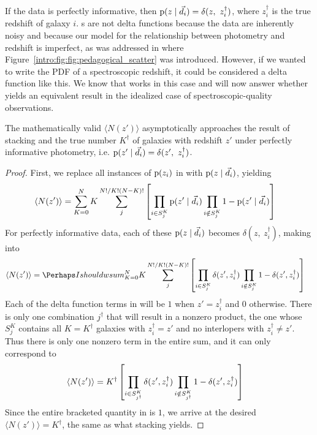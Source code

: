 If the data is perfectly informative, then $\pr{z \gvn \data_{i}} = \delta(z,\ z_{i}^{\dagger})$, where $z_{i}^{\dagger}$ is the true redshift of galaxy $i$.
\Pzpdf s are not delta functions because the data are inherently noisy and because our model for the relationship between photometry and redshift is imperfect, as was addressed in  where Figure~\ref{intro:fig:fig:pedagogical_scatter} was introduced.
However, if we wanted to write the PDF of a spectroscopic redshift, it could be considered a delta function like this.
We know that  works in this case and will now answer whether  yields an equivalent result in the idealized case of spectroscopic-quality observations.

\begin{theorem}
	\label{thm:informative}
	The mathematically valid $\langle N(z') \rangle$ asymptotically approaches the result of stacking and the true number $K^{\dagger}$ of galaxies with redshift $z'$ under perfectly informative photometry, i.e. $\pr{z' \gvn \data_{i}} = \delta(z',\ z^{\dagger}_{i})$.
\end{theorem}
\begin{proof}
	First, we replace all instances of $\mathrm{p}(z_{i})$ in  with $\mathrm{p}(z \mid \vec{d}_{i})$, yielding
	\begin{align}
	\eqlabel{eqn:proofwithdata1}
	\langle N(z') \rangle &= \sum_{K = 0}^{N} K \sum_{j}^{N! / K! (N - K)!} \left[ \prod_{i \in S^{K}_{j}} \pr{z' \gvn \data_{i}} \prod_{i \notin S^{K}_{j}} 1 - \pr{z' \gvn \data_{i}} \right]
	\end{align}
	For perfectly informative data, each of these $\mathrm{p}(z \mid \vec{d}_{i})$ becomes $\delta(z,\ z^{\dagger}_{i})$, making  into
	\begin{align}
	\eqlabel{eqn:proofwithdata2}
	\langle N(z') \rangle &= \Perhaps I should wsum_{K = 0}^{N} K \sum_{j}^{N! / K! (N - K)!} \left[ \prod_{i \in S^{K}_{j}} \delta(z', z^{\dagger}_{i}) \prod_{i \notin S^{K}_{j}} 1 - \delta(z', z^{\dagger}_{i}) \right]
	\end{align}
	Each of the delta function terms in  will be $1$ when $z' = z^{\dagger}_{i}$ and $0$ otherwise.
	There is only one combination $j^{\dagger}$ that will result in a nonzero product, the one whose $S^{K}_{j}$ contains all $K = K^{\dagger}$ galaxies with $z^{\dagger}_{i} = z'$ and no interlopers with $z^{\dagger}_{i} \neq z'$.
	Thus there is only one nonzero term in the entire sum, and it can only correspond to 
	\begin{align}
	\eqlabel{eqn:proofwithdata3}
	\langle N(z') \rangle &= K^{\dagger} \left[ \prod_{i \in S^{K}_{j^{\dagger}}} \delta(z', z^{\dagger}_{i}) \prod_{i \notin S^{K}_{j^{\dagger}}} 1 - \delta(z', z^{\dagger}_{i}) \right]
	\end{align}
	Since the entire bracketed quantity in  is $1$, we arrive at the desired $\langle N(z') \rangle = K^{\dagger}$, the same as what stacking yields.
\end{proof}

